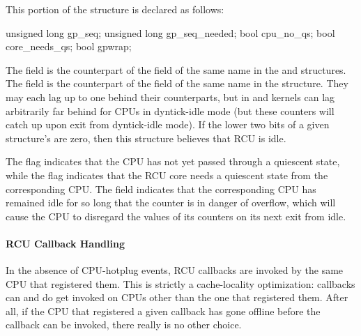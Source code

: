 This portion of the  structure is declared as follows:

\begin{VerbatimN}
		unsigned long gp_seq;
		unsigned long gp_seq_needed;
		bool cpu_no_qs;
		bool core_needs_qs;
		bool gpwrap;
\end{VerbatimN}

The  field is the counterpart of the field of the same name
in the  and  structures.
The
 field is the counterpart of the field of the same
name in the  structure.
They may each lag up to one behind their
 counterparts, but in  and
 kernels can lag arbitrarily far behind for CPUs in
dyntick-idle mode (but these counters will catch up upon exit from
dyntick-idle mode).
If the lower two bits of a given 
structure's  are zero, then this  structure
believes that RCU is idle.

\QuickQuizEnd

The  flag indicates that the CPU has not yet passed
through a quiescent state, while the  flag indicates
that the RCU core needs a quiescent state from the corresponding CPU\@.
The  field indicates that the corresponding CPU has remained
idle for so long that the  counter is in danger of overflow,
which will cause the CPU to disregard the values of its counters on its
next exit from idle.

\paragraph{RCU Callback Handling}

In the absence of CPU-hotplug events, RCU callbacks are invoked by the
same CPU that registered them.
This is strictly a cache-locality
optimization: callbacks can and do get invoked on CPUs other than the
one that registered them.
After all, if the CPU that registered a given
callback has gone offline before the callback can be invoked, there
really is no other choice.

